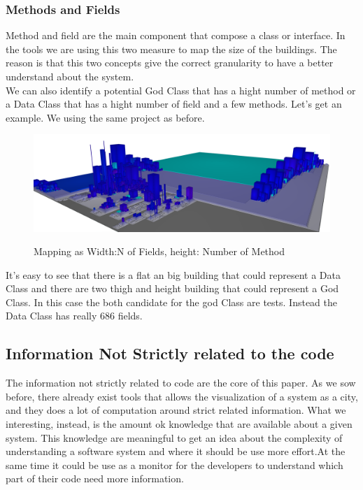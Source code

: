 \documentclass[]{usiinfbachelorproject}
\begin{document}
\subsubsection{Methods  and Fields}
Method and field are the main component that compose a class or interface. In the tools we are using this two measure to map  the size of the buildings. The reason is that this two concepts give the correct granularity to have a better understand about the system.\\
We can also identify a potential God Class that has a hight number of method  or a Data Class that has a hight number of field and a few  methods.
Let's get an example. We using the same project as before.
\begin{figure}[h]
	\centering
	
	\includegraphics[width=1\textwidth]{images/fieldAndMethod}
	\label{fig:classInterface}
	\caption[Fields and Methods Mapping]{Mapping as Width:N of Fields, height: Number of Method}
	
\end{figure}

It's easy to see that there is a  flat an big building that could represent a Data Class and  there are two thigh and height building that could represent a God Class. In this case the both candidate for the god Class are tests. Instead the Data Class has really  686 fields.
    
\pagebreak
\subsection{Information Not Strictly related to the code}
The information not strictly related to  code are the core of this paper. As we sow before, there already exist tools that allows the visualization of a system as a city, and they does a lot of computation around strict related information. What we interesting, instead, is the amount ok knowledge that are available about a given system. This knowledge are meaningful to get an idea about the complexity of understanding a software system and where it should be use more effort.At the same time it  could  be use as a monitor for the developers to understand which part of their code need more information.  
\end{document}
